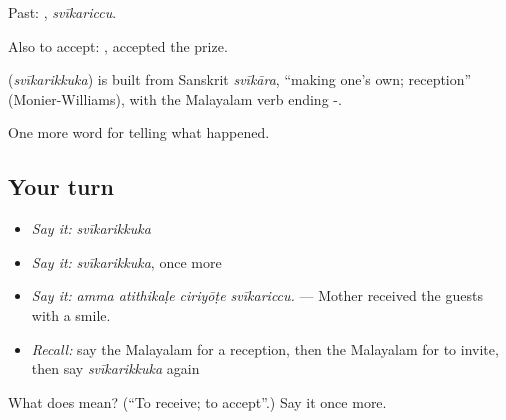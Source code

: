 Past: , \emph{svīkariccu}.

Also to accept:  , accepted the prize.

\begin{cousinweb}
\textbf{} (\emph{svīkarikkuka}) is built from Sanskrit \emph{svīkāra}, \textquotedblleft{}making one's own; reception\textquotedblright{} (Monier-Williams), with the Malayalam verb ending -.
\end{cousinweb}

\begin{grammarlens}[title={What you've built}]
One more word for telling what happened.
\end{grammarlens}

\subsection*{Your turn}
\begin{itemize}
\raggedright
  \item \emph{Say it:} \emph{svīkarikkuka}
  \item \emph{Say it:} \emph{svīkarikkuka}, once more
  \item \emph{Say it:} \emph{amma atithikaḷe ciriyōṭe svīkariccu.} — Mother received the guests with a smile.
  \item \emph{Recall:} say the Malayalam for a reception, then the Malayalam for to invite, then say \emph{svīkarikkuka} again
\end{itemize}

\begin{tcolorbox}[breakable,colback=teal!4,colframe=teal!35!black,title={Before you move on}]
What does  mean? (\textquotedblleft{}To receive; to accept\textquotedblright{}.) Say it once more.
\end{tcolorbox}
